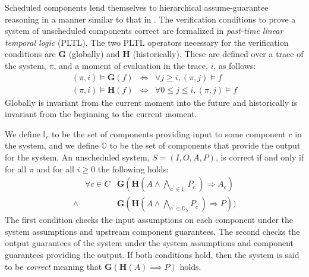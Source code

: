 
\newcommand{\globally}{\ensuremath{\mathbf{G}}}
\newcommand{\historically}{\ensuremath{\mathbf{H}}}
\newcommand{\assumes}{\ensuremath{A}}
\newcommand{\guarantees}{\ensuremath{P}}
\newcommand{\dispatch}{\ensuremath{\mathit{dispatch}}}
\newcommand{\complete}{\ensuremath{\mathit{complete}}}
\newcommand{\same}[1]{\ensuremath{\mathit{same}(#1)}}
\newcommand{\inputs}{\ensuremath{I}}
\newcommand{\outputs}{\ensuremath{O}}
\newcommand{\system}{\ensuremath{S}}
\newcommand{\components}{\ensuremath{C}}
\newcommand{\schedule}{\ensuremath{\phi}}
\newcommand{\valid}{\ensuremath{\mathit{valid}}}

Scheduled components lend themselves to hierarchical assume-guarantee reasoning in a manner similar to that in \cite{AGREE2}.
The verification conditions to prove a system of unscheduled components correct are formalized in \emph{past-time linear temporal logic} (PLTL). 
The two PLTL operators necessary for the verification conditions are $\globally$ (globally) and $\historically$ (historically).
These are defined over a trace of the system, $\pi$, and a moment of evaluation in the trace, $i$, as follows:
\begin{eqnarray*}
 (\pi, i) \models \globally(f) & \iff & \forall j \ge i, (\pi, j) \models f \\
(\pi, i) \models \historically(f) & \iff & \forall 0 \le j \le i, (\pi, j) \models f
\end{eqnarray*}
Globally is invariant from the current moment into the future and historically is invariant from the beginning to the current moment.

We define $\mathbb{I}_c$ to be the set of components providing input to some component $c$ in the system, and we define $\mathbb{O}$ to be the set of components that provide the output for the system. An unscheduled system, $\system = (\inputs, \outputs, \assumes, \guarantees)$, is correct if and only if for all $\pi$ and for all $i \ge 0$ the following holds:
\[
\begin{array}{lll}
        & \forall c \in \components &  
            \globally(\historically(\assumes \wedge 
            \bigwedge_{c^\prime \in \mathbb{I}_c} P_{c^\prime}) 
            \Rightarrow \assumes_c) \\
 \wedge &   & 
            \globally(\historically(\assumes \wedge 
            \bigwedge_{c^\prime \in \mathbb{O}_\system} \guarantees_{c^\prime}) 
            \Rightarrow \guarantees))
\end{array}
\]
The first condition checks the input assumptions on each component under the system assumptions and upstream component guarantees. The second checks the output guarantees of the system under the system assumptions and component guarantees providing the output.  If both conditions hold, then the system is said to be \emph{correct} meaning that $\globally(\historically(\assumes) \implies \guarantees)$ holds.


